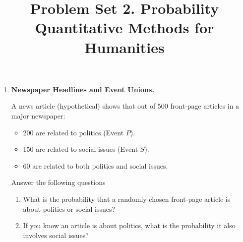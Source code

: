 \documentclass[12pt]{article}
\author{\empty}
\title{Problem Set 2. Probability \\ Quantitative Methods for Humanities}
\date{\empty}
\newif\ifsolutions
\begin{document}
\maketitle

\bigskip

\begin{enumerate}
    \item \textbf{Newspaper Headlines and Event Unions.}
    
    A news article (hypothetical) shows that out of 500 front-page articles in a major newspaper:
    \begin{itemize}[noitemsep]
        \item 200 are related to politics (Event \( P \)).
        \item 150 are related to social issues (Event \( S \)).
        \item 60 are related to both politics and social issues.
    \end{itemize}
    Answer the following questions
    \begin{enumerate}[label=(\alph*)]
        \item What is the probability that a randomly chosen front-page article is about politics or social issues? %
        \item If you know an article is about politics, what is the probability it also involves social issues? %
    \end{enumerate}
    
    \ifsolutions \color{blue} \textbf{Solution:} \\
    \begin{enumerate}[label=(\alph*)]
        \item We know from the problem's data that
        \begin{align*}
            P(P) = \frac{200}{500} = 0.4,\quad P(S) = \frac{150}{500} = 0.3,\quad P(P \cap S) = \frac{60}{500} = 0.12.
        \end{align*}
        Therefore,
        \begin{align*}
            P(P \cup S) = P(P) + P(S) - P(P \cap S) = 0.4 + 0.3 - 0.12 = 0.58.
        \end{align*}
        That is, there is a 58\% chance that an article is about politics or social issues.
        
        \item This part is about computing the conditional probability $P(S \mid P) = \frac{0.12}{0.4} = 0.3$, meaning that, given that an article is about politics, there is a 30\% chance it also involves social issues.
    \end{enumerate}
    \fi \color{black}


\end{enumerate}
\end{document}
